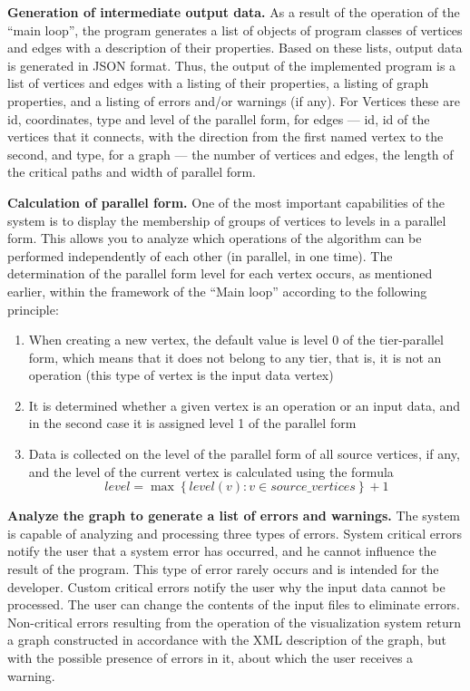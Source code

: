 \textbf{Generation of intermediate output data.} As a result of the operation of the ``main loop'', the program generates a list of objects of program classes of vertices and edges with a description of their properties. Based on these lists, output data is generated in JSON format. Thus, the output of the implemented program is a list of vertices and edges with a listing of their properties, a listing of graph properties, and a listing of errors and/or warnings (if any). For Vertices these are id, coordinates, type and level of the parallel form, for edges --- id, id of the vertices that it connects, with the direction from the first named vertex to the second, and type, for a graph --- the number of vertices and edges, the length of the critical paths and width of parallel form.

\textbf{Calculation of parallel form.} One of the most important capabilities of the system is to display the membership of groups of vertices to levels in a parallel form. This allows you to analyze which operations of the algorithm can be performed independently of each other (in parallel, in one time). The determination of the parallel form level for each vertex occurs, as mentioned earlier, within the framework of the ``Main loop'' according to the following principle:

\begin{enumerate}
    \item When creating a new vertex, the default value is level 0 of the tier-parallel form, which means that it does not belong to any tier, that is, it is not an operation (this type of vertex is the input data vertex)
    \item It is determined whether a given vertex is an operation or an input data, and in the second case it is assigned level 1 of the parallel form
    \item Data is collected on the level of the parallel form of all source vertices, if any, and the level of the current vertex is calculated using the formula
    $$ level = \max\left\{level(v): v \in source\_vertices\right\} + 1 $$
\end{enumerate}

\textbf{Analyze the graph to generate a list of errors and warnings.} The system is capable of analyzing and processing three types of errors. System critical errors notify the user that a system error has occurred, and he cannot influence the result of the program. This type of error rarely occurs and is intended for the developer. Custom critical errors notify the user why the input data cannot be processed. The user can change the contents of the input files to eliminate errors. Non-critical errors resulting from the operation of the visualization system return a graph constructed in accordance with the XML description of the graph, but with the possible presence of errors in it, about which the user receives a warning.

